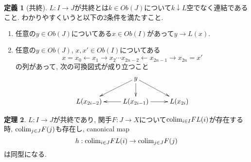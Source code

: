\documentclass[dvipdfmx,a4paper,11pt]{article}
\newcommand{\colim}{{\rm colim}}
\theoremstyle{definition}
\newtheorem{thm}{定理}
\newtheorem{dfn}[thm]{定義}
\begin{document}
 \begin{tcolorbox}
 [colback = white, colframe = green!35!black, fonttitle = \bfseries,breakable = true]
\begin{dfn}[共終]
\label{dfn-cofiinal-category}
$L : I \to J$が共終とは$k \in Ob(J)$について$k \downarrow L$空でなく連結であること.
わかりやすくいうと以下の2条件を満たすこと.
\begin{enumerate}
\item 任意の$y\in Ob(J)$についてある$x \in Ob(I)$があって$y \to L(x)$.
\item  任意の$y\in Ob(J)$, $x, x' \in Ob(I)$についてある
$$
x=x_0 \leftarrow x_1 \to x_2 \cdots x_{2n-2} \leftarrow x_{2n-1} \to x_{2n}=x'
$$
の列があって, 次の可換図式が成り立つこと
\begin{equation*}
\xymatrix@C=25pt@R=20pt{
& y\ar@{->}[ld]\ar@{->}[d]\ar@{->}[rd]
&
\\
L(x_{2i-2})
&L(x_{2i-1})\ar@{->}[l]\ar@{->}[r]
&L(x_{2i}) \\   
}
\end{equation*}
\end{enumerate}
\end{dfn}
\end{tcolorbox}

 \begin{tcolorbox}
 [colback = white, colframe = green!35!black, fonttitle = \bfseries,breakable = true]
\begin{thm}
\label{thm-cofinal-commute}
$L : I \to J$が共終であり, 関手$F : J \to X$について$\colim_{i\in I}FL(i)$が存在する時, 
$\colim_{j \in J} F(j)$も存在し, canonical map
$$
h : \colim_{i \in J}FL(i) \to \colim_{j \in J} F(j)
$$
は同型になる. 
\end{thm}
\end{tcolorbox}
\end{document}
